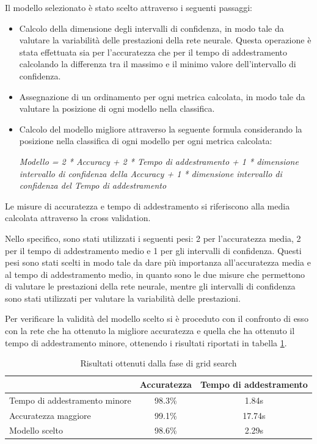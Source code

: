 Il modello selezionato è stato scelto attraverso i seguenti passaggi:
\begin{itemize}
    \item Calcolo della dimensione degli intervalli di confidenza, in modo tale
          da valutare la variabilità delle prestazioni della rete neurale.
          Questa operazione è stata effettuata sia per l'accuratezza che per il
          tempo di addestramento calcolando la differenza tra il massimo e il
          minimo valore dell'intervallo di confidenza.
    \item Assegnazione di un ordinamento per ogni metrica calcolata, in modo tale
          da valutare la posizione di ogni modello nella classifica.
    \item Calcolo del modello migliore attraverso la seguente formula considerando
          la posizione nella classifica di ogni modello per ogni metrica calcolata:
          \begin{center}
              \textit{Modello = 2 * Accuracy + 2 * Tempo di addestramento + 1 * dimensione intervallo di confidenza della Accuracy + 1 * dimensione intervallo di confidenza del Tempo di addestramento}
          \end{center}
\end{itemize}
Le misure di accuratezza e tempo di addestramento si riferiscono alla media
calcolata attraverso la cross validation.

Nello specifico, sono stati utilizzati i seguenti pesi: 2 per l'accuratezza
media, 2 per il tempo di addestramento medio e 1 per gli intervalli di
confidenza. Questi pesi sono stati scelti in modo tale da dare più importanza
all'accuratezza media e al tempo di addestramento medio, in quanto sono le due
misure che permettono di valutare le prestazioni della rete neurale, mentre gli
intervalli di confidenza sono stati utilizzati per valutare la variabilità delle
prestazioni.

Per verificare la validità del modello scelto si è proceduto con il confronto di
esso con la rete che ha ottenuto la migliore accuratezza e quella che ha ottenuto
il tempo di addestramento minore, ottenendo i risultati riportati in tabella \ref{tab:ris-grid-search}.
\begin{table}[ht]
    \centering
    \begin{tabular}{@{}lcc@{}}
        \toprule
        \rowcolor[HTML]{EFEFEF}
        \multicolumn{1}{c}{\cellcolor[HTML]{EFEFEF}\textbf{Modello}} & \textbf{Accuratezza} & \textbf{Tempo di addestramento} \\ \midrule
        Tempo di addestramento minore                                & 98.3\%               & 1.84s                           \\
        Accuratezza maggiore                                         & 99.1\%               & 17.74s                          \\
        Modello scelto                                               & 98.6\%               & 2.29s                           \\ \bottomrule
    \end{tabular}
    \caption{Risultati ottenuti dalla fase di grid search}
    \label{tab:ris-grid-search}
\end{table}

